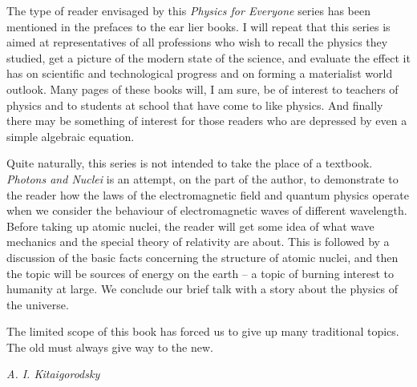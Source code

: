 The type of reader envisaged by this \emph{Physics for Every­one} series has been mentioned in the prefaces to the ear­ lier books. I will repeat that this series is aimed at repre­sentatives of all professions who wish to recall the phys­ics they studied, get a picture of the modern state of the science, and evaluate the effect it has on scientific and technological progress and on forming a materialist world outlook. Many pages of these books will, I am sure, be of interest to teachers of physics and to students at school that have come to like physics. And finally there may be something of interest for those readers who are depressed by even a simple algebraic equation.

Quite naturally, this series is not intended to take the place of a textbook. \emph{Photons and Nuclei} is an attempt, on the part of the author, to demonstrate to the reader how the laws of the electromagnetic field and quantum physics operate when we consider the behaviour of electromagnetic waves of different wavelength. Before taking up atomic nuclei, the reader will get some idea of what wave mechanics and the special theory of relativity are about. This is followed by a discussion of the basic facts concerning the structure of atomic nuclei, and then the topic will be sources of energy on the earth -- a topic of burning interest to humanity at large. We conclude our brief talk with a story about the physics of the universe.

The limited scope of this book has forced us to give up many traditional topics. The old must always give way to the new.

\begin{flushright}
 \emph{%
A. I. Kitaigorodsky}
\end{flushright}
\newpage

